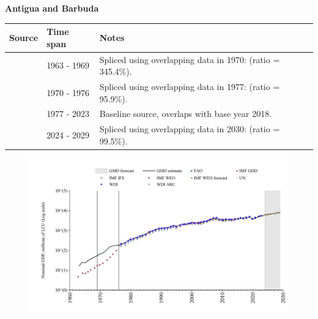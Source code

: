 \documentclass[12pt,a4paper,landscape]{article}
\begin{document}
\begin{adjustbox}{max totalsize={\paperwidth}{\paperheight},center}
\begin{minipage}[t][\textheight][t]{\textwidth}
\vspace*{0.5cm}
{}
\begin{center}
{\Large\bfseries Antigua and Barbuda}
\end{center}
\vspace{0.5cm}
\begin{table}[H]
\centering
\small
\begin{tabular}{|l|l|l|}
\hline
\textbf{Source} & \textbf{Time span} & \textbf{Notes} \\
\hline
\rowcolor{white}\cite{IMF_GDD}& 1963 - 1969 &Spliced using overlapping data in 1970: (ratio = 345.4\%).\\
\rowcolor{lightgray}\cite{UN}& 1970 - 1976 &Spliced using overlapping data in 1977: (ratio = 95.9\%).\\
\rowcolor{white}\cite{WDI}& 1977 - 2023 &Baseline source, overlaps with base year 2018.\\
\rowcolor{lightgray}\cite{IMF_WEO_forecast}& 2024 - 2029 &Spliced using overlapping data in 2030: (ratio = 99.5\%).\\
\hline
\end{tabular}
\end{table}
\begin{figure}[H]
\centering
\includegraphics[width=\textwidth,height=0.6\textheight,keepaspectratio]{graphs/ATG_nGDP.pdf}
\end{figure}
\end{minipage}
\end{adjustbox}
\end{document}
